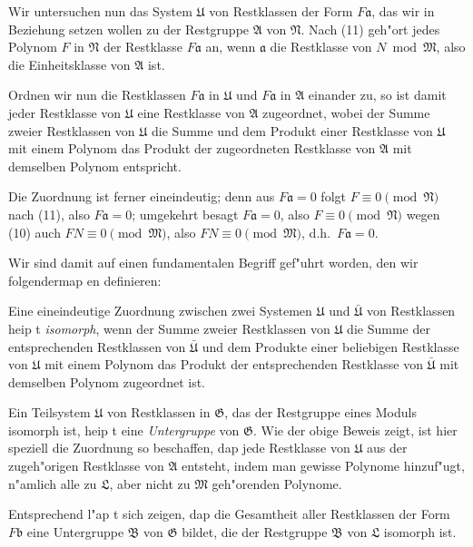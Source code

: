 \documentclass[12pt,a4paper]{article}
\begin{document}
Wir untersuchen nun das System $\mathfrak{U}$ von Restklassen der Form $F\mathfrak{a}$, das wir in Beziehung setzen wollen zu der Restgruppe $\mathfrak{A}$ von $\mathfrak{N}$. Nach (11) geh"ort jedes Polynom $F$ in $\mathfrak{N}$ der Restklasse $F\mathfrak{a}$ an, wenn $\mathfrak{a}$ die Restklasse von $N \bmod \mathfrak{M}$, also die Einheitsklasse von $\mathfrak{A}$ ist.

Ordnen wir nun die Restklassen $F\mathfrak{a}$ in $\mathfrak{U}$ und $F\mathfrak{a}$ in $\mathfrak{A}$ einander zu, so ist damit jeder Restklasse von $\mathfrak{U}$ eine Restklasse von $\mathfrak{A}$ zugeordnet, wobei der Summe zweier Restklassen von $\mathfrak{U}$ die Summe und dem Produkt einer Restklasse von $\mathfrak{U}$ mit einem Polynom das Produkt der zugeordneten Restklasse von $\mathfrak{A}$ mit demselben Polynom entspricht.

Die Zuordnung ist ferner eineindeutig; denn aus $F\mathfrak{a} = 0$ folgt $F \equiv 0 \pmod{\mathfrak{N}}$ nach (11), also $F\mathfrak{a} = 0$; umgekehrt besagt $F\mathfrak{a} = 0$, also $F \equiv 0 \pmod{\mathfrak{N}}$ wegen (10) auch $FN \equiv 0 \pmod{\mathfrak{M}}$, also $FN \equiv 0 \pmod{\mathfrak{M}}$, d.h.\ $F\mathfrak{a} = 0$.

Wir sind damit auf einen fundamentalen Begriff gef"uhrt worden, den wir folgendermap en definieren:

Eine eineindeutige Zuordnung zwischen zwei Systemen $\mathfrak{U}$ und $\bar{\mathfrak{U}}$ von Restklassen heip t \emph{isomorph}, wenn der Summe zweier Restklassen von $\mathfrak{U}$ die Summe der entsprechenden Restklassen von $\bar{\mathfrak{U}}$ und dem Produkte einer beliebigen Restklasse von $\mathfrak{U}$ mit einem Polynom das Produkt der entsprechenden Restklasse von $\bar{\mathfrak{U}}$ mit demselben Polynom zugeordnet ist.

Ein Teilsystem $\mathfrak{U}$ von Restklassen in $\mathfrak{G}$, das der Restgruppe eines Moduls isomorph ist, heip t eine \emph{Untergruppe} von $\mathfrak{G}$. Wie der obige Beweis zeigt, ist hier speziell die Zuordnung so beschaffen, dap jede Restklasse von $\mathfrak{U}$ aus der zugeh"origen Restklasse von $\mathfrak{A}$ entsteht, indem man gewisse Polynome hinzuf"ugt, n"amlich alle zu $\mathfrak{L}$, aber nicht zu $\mathfrak{M}$ geh"orenden Polynome.

Entsprechend l"ap t sich zeigen, dap die Gesamtheit aller Restklassen der Form $F\mathfrak{b}$ eine Untergruppe $\mathfrak{B}$ von $\mathfrak{G}$ bildet, die der Restgruppe $\mathfrak{B}$ von $\mathfrak{L}$ isomorph ist.
\end{document}
